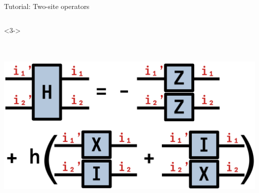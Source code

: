 \begin{frame}[fragile]{Tutorial: Two-site operators}
\begin{columns}
\begin{column}{5.5cm}
\begin{onlyenv}<3->
\vspace*{0.0cm}
~\\
~\\
~\\
\begin{center}
\includegraphics[width=1.0\textwidth]{
  slides/assets/ising12.png
}
\end{center}
\vspace*{0.0cm}
\end{onlyenv}

\end{column}

\end{columns}

\end{frame}
